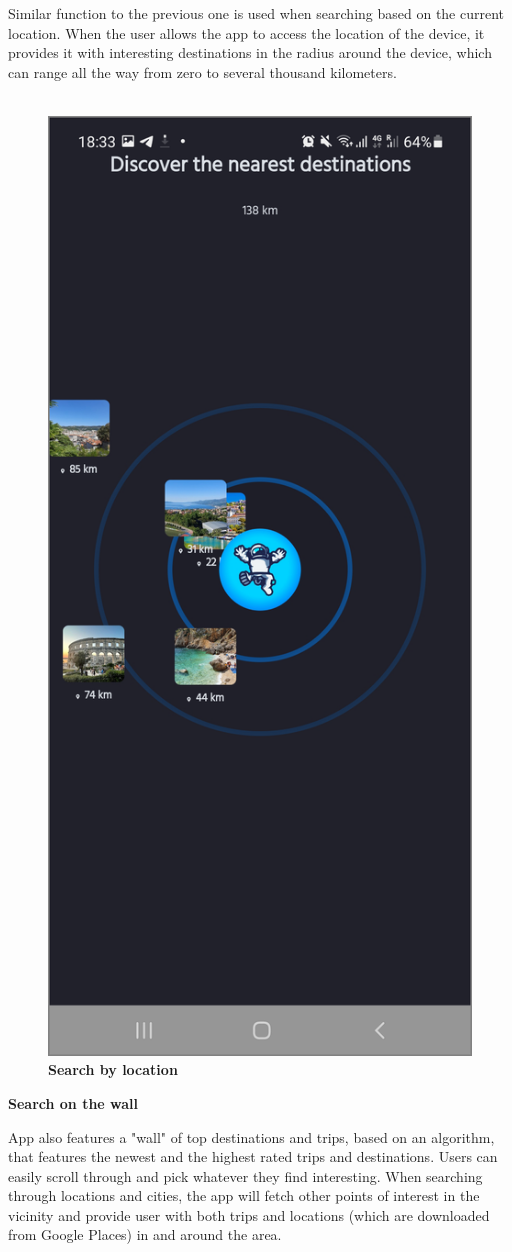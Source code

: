 Similar function to the previous one is used when searching based on the current location. When the user allows the app to access the location of the device, it provides it with interesting destinations in the radius around the device, which can range all the way from zero to several thousand kilometers.\\ \\
\begin{figure}[!htb]
\centering
\includegraphics[width=.45\textwidth]{../Images/UI/LocationDark.jpg}
\caption{\label{fig:dbapiuser}\textbf{Search by location}}
\end{figure}
\newpage

\textbf{Search on the wall}

App also features a "wall" of top destinations and trips, based on an algorithm, that features the newest and the highest rated trips and destinations. Users can easily scroll through and pick whatever they find interesting. When searching through locations and cities, the app will fetch other points of interest in the vicinity and provide user with both trips and locations (which are downloaded from Google Places) in and around the area.\\ \\

